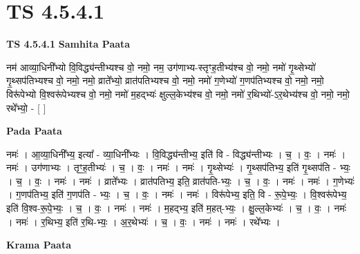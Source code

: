 \documentclass[17pt]{extarticle}
\begin{document}
\section{ TS 4.5.4.1 }

\textbf{TS 4.5.4.1 } \newline
\textbf{Samhita Paata} \newline

नम॑ आव्या॒धिनी᳚भ्यो वि॒विद्ध्य॑न्तीभ्यश्च वो॒ नमो॒                             नम॒ उग॑णाभ्य-स्तृꣳह॒तीभ्य॑श्च वो॒ नमो॒                                          नमो॑ गृ॒थ्सेभ्यो॑ गृ॒थ्सप॑तिभ्यश्च वो॒ नमो॒                                                नमो॒ व्राते᳚भ्यो॒ व्रात॑पतिभ्यश्च वो॒ नमो॒                                             नमो॑ ग॒णेभ्यो॑ ग॒णप॑तिभ्यश्च वो॒ नमो॒                                                      नमो॒ विरू॑पेभ्यो वि॒श्वरू॑पेभ्यश्च वो॒ नमो॒                                            नमो॑ म॒हद्भ्यः॑ क्षुल्ल॒केभ्य॑श्च वो॒ नमो॒                                           नमो॑ र॒थिभ्यो॑-ऽर॒थेभ्य॑श्च वो॒ नमो॒                                                       नमो॒ रथे᳚भ्यो॒ - [  ] \newline

\textbf{Pada Paata} \newline

नमः॑ । आ॒व्या॒धिनी᳚भ्य॒ इत्या᳚ - व्या॒धिनी᳚भ्यः । वि॒विद्ध्य॑न्तीभ्य॒ इति॑ वि - विद्ध्य॑न्तीभ्यः । च॒ । वः॒ । नमः॑ । नमः॑ । उग॑णाभ्यः । तृꣳ॒॒ह॒तीभ्यः॑ । च॒ । वः॒ । नमः॑ । नमः॑ । गृ॒थ्सेभ्यः॑ । गृ॒थ्सप॑तिभ्य॒ इति॑ गृ॒थ्सप॑ति - भ्यः॒ । च॒ । वः॒ । नमः॑ । नमः॑ । व्राते᳚भ्यः । व्रात॑पतिभ्य॒ इति॒ व्रात॑पति-भ्यः॒ । च॒ । वः॒ । नमः॑ । नमः॑ । ग॒णेभ्यः॑ । ग॒णप॑तिभ्य॒ इति॑ ग॒णप॑ति - भ्यः॒ । च॒ । वः॒ । नमः॑ । नमः॑ । विरू॑पेभ्य॒ इति॒ वि - रू॒पे॒भ्यः॒ । वि॒श्वरू॑पेभ्य॒ इति॑ वि॒श्व-रू॒पे॒भ्यः॒ । च॒ । वः॒ । नमः॑ । नमः॑ । म॒हद्भ्य॒ इति॑ म॒हत्-भ्यः॒ । क्षु॒ल्ल॒केभ्यः॑ । च॒ । वः॒ । नमः॑ । नमः॑ । र॒थिभ्य॒ इति॑ र॒थि-भ्यः॒ । अ॒र॒थेभ्यः॑ । च॒ । वः॒ । नमः॑ । नमः॑ । रथे᳚भ्यः ।  \newline


\textbf{Krama Paata} \newline
\end{document}

